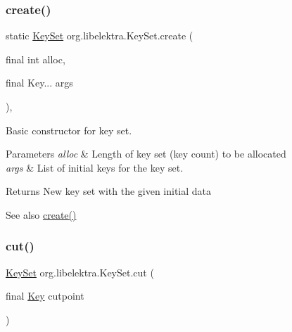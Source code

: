 \subsubsection{\texorpdfstring{create()}{create()}\hspace{0.1cm}{\footnotesize\ttfamily [3/3]}}
{\footnotesize\ttfamily static \hyperlink{classorg_1_1libelektra_1_1KeySet}{Key\+Set} org.\+libelektra.\+Key\+Set.\+create (\begin{DoxyParamCaption}\item[{final int}]{alloc,  }\item[{final Key...}]{args }\end{DoxyParamCaption})\hspace{0.3cm}{\ttfamily [inline]}, {\ttfamily [static]}}



Basic constructor for key set. 


\begin{DoxyParams}{Parameters}
{\em alloc} & Length of key set (key count) to be allocated \\
\hline
{\em args} & List of initial keys for the key set. \\
\hline
\end{DoxyParams}
\begin{DoxyReturn}{Returns}
New key set with the given initial data 
\end{DoxyReturn}
\begin{DoxySeeAlso}{See also}
\hyperlink{classorg_1_1libelektra_1_1KeySet_ac0ba4b88bef5e731b586f4ca63b9ab7f}{create()} 
\end{DoxySeeAlso}
\mbox{\label{classorg_1_1libelektra_1_1KeySet_a470743c3a6f873427d057c6ce7e3661c}} 
\subsubsection{\texorpdfstring{cut()}{cut()}}
{\footnotesize\ttfamily \hyperlink{classorg_1_1libelektra_1_1KeySet}{Key\+Set} org.\+libelektra.\+Key\+Set.\+cut (\begin{DoxyParamCaption}\item[{final \hyperlink{classorg_1_1libelektra_1_1Key}{Key}}]{cutpoint }\end{DoxyParamCaption})\hspace{0.3cm}{\ttfamily [inline]}}



